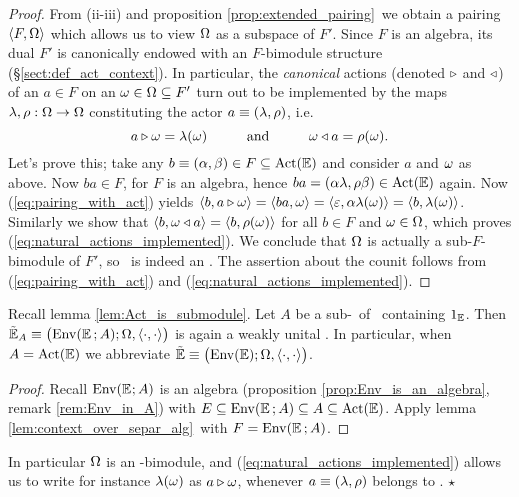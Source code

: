 \begin{proof}
  From (ii-iii) and proposition \ref{prop:extended_pairing}\ we obtain a
  pairing $\langle F,\Omega \rangle$ which allows us to view $\Omega$ as a subspace of $F'$\@.
  Since $F$ is an algebra, its dual $F'$ is canonically endowed with an
  $F$-bimodule structure (\S\ref{sect:def_act_context}).
  In particular, the {\em canonical\/} actions (denoted $\triangleright$ and $\triangleleft$)
  of an $a\in F$ on an $\omega\in\Omega \subseteq F'$
  turn out to be implemented by the maps $\lambda, \rho : \Omega \rightarrow \Omega$
  constituting the actor $a\equiv(\lambda,\rho)$, i.e.\
  \begin{equation} \label{eq:natural_actions_implemented}
     a \lact \om = \lam(\om)  \andspace{10mm}
     \om \ract a = \rho(\om).
  \end{equation}
  Let's prove this; take any
  $b\equiv (\alpha,\beta) \in F\subseteq\mbox{\rm Act}(\mathbb{E})$ and consider
  $a$ and $\omega$ as above. Now $ba \in F$, for $F$ is an algebra,
  hence $ba=(\alpha\lambda,\rho\beta) \in \mbox{\rm Act}(\mathbb{E})$ again.
  Now (\ref{eq:pairing_with_act}) yields
  $\langle b,a \triangleright \omega \rangle = \langle ba,\omega \rangle = \langle \varepsilon,\alpha\lambda(\omega) \rangle
         =\langle b,\lambda(\omega) \rangle$.
  Similarly we show that $\langle b,\omega \triangleleft a \rangle = \langle b,\rho(\omega) \rangle$
  for all $b\in F$ and $\omega \in \Omega$,
  which proves (\ref{eq:natural_actions_implemented}).
  We conclude that $\Omega$ is actually a sub-$F$-bimodule of $F'$,
  so \FF\ is indeed an \context\@. The assertion about the counit follows from
  (\ref{eq:pairing_with_act}) and (\ref{eq:natural_actions_implemented}).
\end{proof}


\begin{prop_sec}  \label{prop:def:enveloping_context}
  Recall lemma \ref{lem:Act_is_submodule}\@.
  Let $A$ be a sub-\Ebimod\ of \ActE\ containing $1_{\mathbb{E}}$. Then\/
  $\tilde{\EE}_A \equiv \left(\vertM {\rm Env}(\EE\,;A);\Om,\pairing \right) $
  is again a weakly unital \context\@.
  \rm In particular, when $A=\mbox{\rm Act}(\mathbb{E})$ we abbreviate\/
  $\tilde{\EE} \equiv \left(\vertM \EnvE; \Om,\pairing  \right)$.
\end{prop_sec}


\begin{proof}
  Recall ${\rm Env}(\mathbb{E}\hspace{.5pt};A)$ is an algebra
  (proposition \ref{prop:Env_is_an_algebra}, remark \ref{rem:Env_in_A})
  with $E \subseteq {\rm Env}(\mathbb{E}\,;A) \subseteq A \subseteq \mbox{\rm Act}(\mathbb{E})$.
  Apply lemma \ref{lem:context_over_separ_alg}\ with $F={\rm Env}(\mathbb{E}\,;A)$.
\end{proof}


\begin{remark_sec} \label{rem:module_notation_for_Env}
  \rm
  In particular $\Omega$ is an \EnvE-bimodule, and (\ref{eq:natural_actions_implemented})
  allows us to write for instance $\lambda(\omega)$
  as $a\triangleright\omega$, whenever $a\equiv(\lambda,\rho)$ belongs to \EnvE.
  \hfill $\star$
\end{remark_sec}


